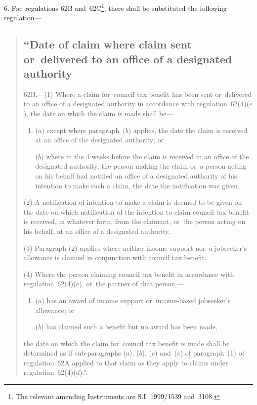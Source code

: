 \documentclass[12pt,a4paper]{article}
\begin{document}
6.  For~regulations 62B and~62C\footnote{\frenchspacing The relevant amending Instruments are S.I. 1999/1539 and~3108.}, there shall be substituted the following regulation—
\begin{quotation}
\subsection*{“Date of claim where claim sent or~delivered to an office of a designated authority}

62B.---(1)  Where a claim for~council tax benefit has been sent or~delivered to an office of a designated authority in accordance with regulation~62(4)($e$), the date on which the claim is made shall be—
\begin{enumerate}\item[]
($a$) except where paragraph~($b$)  applies, the date the claim is received at an office of the designated authority; or

($b$) where in the 4 weeks before the claim is received in an office of the designated authority, the person making the claim or~a person acting on his behalf had notified an office of a \pagebreak[3] designated authority of his intention to make such a claim, the date the notification was given.
\end{enumerate}

(2) A notification of intention to make a claim is deemed to be given on the date on which notification of the intention to claim council tax benefit is received, in whatever form, from the claimant, or~the person acting on his behalf, at an office of a designated authority.

(3) Paragraph (2) applies where neither income support nor~a jobseeker’s allowance is claimed in conjunction with council tax benefit.

(4) Where the person claiming council tax benefit in accordance with regulation~62(4)($e$), or~the partner of that person,—
\begin{enumerate}\item[]
($a$) has an award of income support or~income-based jobseeker’s allowance; or

($b$) has claimed such a benefit but no award has been made,
\end{enumerate}
the date on which the claim for~council tax benefit is made shall be determined as if sub-paragraphs ($a$), ($b$), ($c$)  and~($e$)  of paragraph~(1) of regulation~62A applied to that claim as they apply to claims under regulation~62(4)($d$).”.
\end{quotation}
\end{document}
